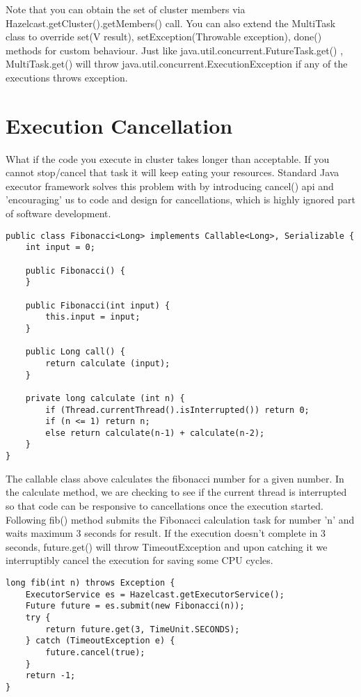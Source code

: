 Note that you can obtain the set of cluster members via Hazelcast.getCluster().getMembers() call. You can also extend the MultiTask class to override set(V result), setException(Throwable exception), done() methods for custom behaviour. Just like java.util.concurrent.FutureTask.get() , MultiTask.get() will throw java.util.concurrent.ExecutionException if any of the executions throws exception.

\section{Execution Cancellation}

What if the code you execute in cluster takes longer than acceptable. If you cannot stop/cancel that task it will keep eating your resources. Standard Java executor framework solves this problem with by introducing cancel() api and 'encouraging' us to code and design for cancellations, which is highly ignored part of software development.

\begin{verbatim}
public class Fibonacci<Long> implements Callable<Long>, Serializable {
    int input = 0; 

    public Fibonacci() { 
    } 

    public Fibonacci(int input) { 
        this.input = input;
    } 

    public Long call() {
        return calculate (input);
    }

    private long calculate (int n) {
        if (Thread.currentThread().isInterrupted()) return 0;
        if (n <= 1) return n;
        else return calculate(n-1) + calculate(n-2);
    }
}
\end{verbatim}

The callable class above calculates the fibonacci number for a given number. In the calculate method, we are checking to see if the current thread is interrupted so that code can be responsive to cancellations once the execution started. Following fib() method submits the Fibonacci calculation task for number 'n' and waits maximum 3 seconds for result. If the execution doesn't complete in 3 seconds, future.get() will throw TimeoutException and upon catching it we interruptibly cancel the execution for saving some CPU cycles.

\begin{verbatim}
long fib(int n) throws Exception {
    ExecutorService es = Hazelcast.getExecutorService();
    Future future = es.submit(new Fibonacci(n));  
    try {
        return future.get(3, TimeUnit.SECONDS);
    } catch (TimeoutException e) {
        future.cancel(true);            
    }
    return -1;
}
\end{verbatim}
	
